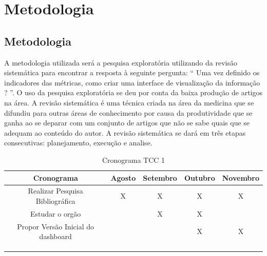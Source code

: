 \chapter[Metodologia]{Metodologia}
\section{Metodologia}

A metodologia utilizada será a pesquisa exploratória utilizando da revisão sistemática para encontrar a resposta à seguinte pergunta: “ Uma vez definido os indicadores das métricas, como criar uma interface de visualização da informação ? ”. O uso da pesquisa exploratória se deu por conta da baixa produção de artigos na área. A revisão sistemática é uma técnica criada na área da medicina que se difundiu para outras áreas de conhecimento por causa da produtividade que se ganha ao se deparar com um conjunto de artigos que não se sabe quais que se adequam ao conteúdo do autor. A revisão sistemática se dará em três etapas consecutivas: planejamento, execução e analise.

\begin{table}[http]
	\centering
	\caption{Cronograma TCC 1}
	\label{tab:cronograma}
	\begin{tabular}{ccccc}
		\hline
		\multicolumn{1}{|c|}{\textbf{Cronograma}}             & \multicolumn{1}{c|}{\textbf{Agosto}} & \multicolumn{1}{c|}{\textbf{Setembro}} & \multicolumn{1}{c|}{\textbf{Outubro}} & \multicolumn{1}{c|}{\textbf{Novembro}} \\ \hline
		\multicolumn{1}{|c|}{Realizar Pesquisa Bibliográfica} & \multicolumn{1}{c|}{X}              & \multicolumn{1}{c|}{X}              & \multicolumn{1}{c|}{X}             & \multicolumn{1}{c|}{X}              \\ \hline
		\multicolumn{1}{|c|}{Estudar o orgão}             & \multicolumn{1}{c|}{}               & \multicolumn{1}{c|}{X}              & \multicolumn{1}{c|}{X}             & \multicolumn{1}{c|}{}               \\ \hline
		\multicolumn{1}{|c|}{Propor Versão Inicial do dashboard}                & \multicolumn{1}{c|}{}               & \multicolumn{1}{c|}{}               & \multicolumn{1}{c|}{X}             & \multicolumn{1}{c|}{X}              \\ \hline
		\multicolumn{1}{l}{}                                  & \multicolumn{1}{l}{}                & \multicolumn{1}{l}{}                & \multicolumn{1}{l}{}               & \multicolumn{1}{l}{}                \\
		\multicolumn{1}{l}{}                                  & \multicolumn{1}{l}{}                & \multicolumn{1}{l}{}                & \multicolumn{1}{l}{}               & \multicolumn{1}{l}{}                \\
		\multicolumn{1}{l}{}                                  & \multicolumn{1}{l}{}                & \multicolumn{1}{l}{}                & \multicolumn{1}{l}{}               & \multicolumn{1}{l}{}               
	\end{tabular}
\end{table}

